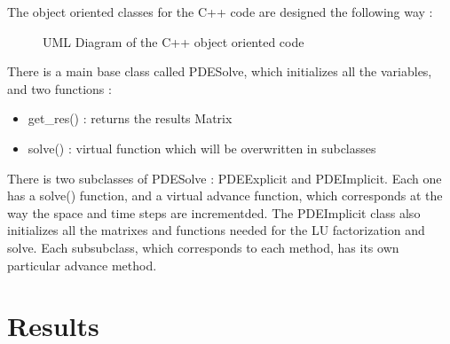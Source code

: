 \documentclass{article}
\begin{document}
                The object oriented classes for the C++ code are designed the following way :\\
                \begin{figure}[H]
                    \caption{UML Diagram of the C++ object oriented code}
                \end{figure}
                There is a main base class called PDESolve, which initializes all the variables, and two functions :
                \begin{itemize}
                    \item{get\_res() : returns the results Matrix}
                    \item{solve() : virtual function which will be overwritten in subclasses}
                \end{itemize}
                There is two subclasses of PDESolve : PDEExplicit and PDEImplicit. Each one has a solve() function, and a virtual advance function,
                which corresponds at the way the space and time steps are incrementded.
                The PDEImplicit class also initializes all the matrixes and functions needed for the LU factorization and solve.
                Each subsubclass, which corresponds to each method, has its own particular advance method.
        \newpage
        \section{Results}
\end{document}
